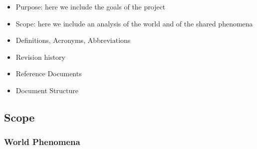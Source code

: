 \begin{itemize}
\item
Purpose: here we include the goals of the project
\item
Scope: here we include an analysis of the world and of the shared phenomena
\item
Definitions, Acronyms, Abbreviations
\item
Revision history
\item
Reference Documents 
\item
Document Structure
\end{itemize}
\subsection{Scope}
\subsubsection{World Phenomena}
